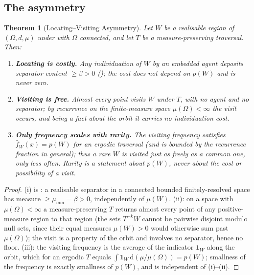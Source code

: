 \documentclass[11pt,twocolumn,a4paper]{article}
\theoremstyle{thmstyle}
\newtheorem{theorem}{Theorem}[section]
\theoremstyle{definition}
\theoremstyle{remark}
\newcommand{\Space}{\Omega}
\newcommand{\thick}{\beta}
\begin{document}
\subsection{The asymmetry}

\begin{theorem}[Locating--Visiting Asymmetry]
\label{thm:asymmetry}
Let $W$ be a realisable region of $(\Space,d,\mu)$ under  with
$\Space$ connected, and let $T$ be a measure-preserving traversal. Then:
\begin{enumerate}[label=\textup{(\roman*)},leftmargin=2.4em]
\item \textbf{Locating is costly.} Any individuation of $W$ by an embedded agent
deposits separator content $\ge\thick>0$ \textup{(}\textup{)};
the cost does not depend on $p(W)$ and is never zero.
\item \textbf{Visiting is free.} Almost every point visits $W$ under $T$, with no
agent and no separator; by recurrence on the finite-measure space
$\mu(\Space)<\infty$ the visit occurs, and being a fact about the orbit it carries
no individuation cost.
\item \textbf{Only frequency scales with rarity.} The visiting frequency satisfies
$\bar f_W(x)=p(W)$ for an ergodic traversal \textup{(}and is bounded by the
recurrence fraction in general\textup{)}; thus a rare $W$ is visited just as
freely as a common one, only \emph{less often}. Rarity is a statement about
$p(W)$, never about the cost or possibility of a visit.
\end{enumerate}
\end{theorem}

\begin{proof}
(i) is : a realisable separator in a connected bounded
finitely-resolved space has measure $\ge\mu_{\min}=\thick>0$, independently of
$\mu(W)$. (ii): on a space with $\mu(\Space)<\infty$ a measure-preserving $T$
returns almost every point of any positive-measure region to that region (the sets
$T^{-k}W$ cannot be pairwise disjoint modulo null sets, since their equal measures
$\mu(W)>0$ would otherwise sum past $\mu(\Space)$); the visit is a property of the
orbit and involves no separator, hence no floor. (iii): the visiting frequency is
the average of the indicator $\mathbf 1_W$ along the orbit, which for an ergodic
$T$ equals $\int \mathbf 1_W\,\mathrm d(\mu/\mu(\Space))=p(W)$; smallness of the
frequency is exactly smallness of $p(W)$, and is independent of (i)--(ii).
\end{proof}
\end{document}
